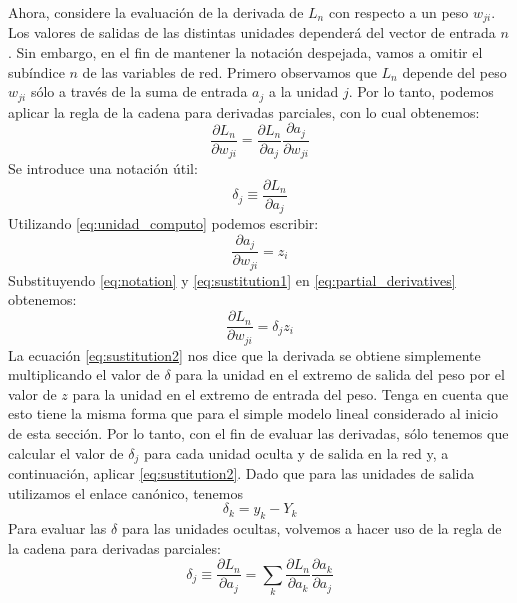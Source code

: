 \documentclass[a4paper,11pt,spanish]{book}
\begin{document}
	Ahora, considere la evaluación de la derivada de $L_n$ con respecto a un peso $w_{ji}$. 
	Los valores de salidas de las distintas unidades dependerá del vector de entrada $n$.
	Sin embargo, en el fin de mantener la notación despejada, vamos a omitir el subíndice $n$ de las variables de red. 
	Primero observamos que $L_n$ depende del peso $w_{ji}$ sólo a través de la suma de entrada $a_j$ a la unidad $j$. 
	Por lo tanto, podemos aplicar la regla de la cadena para derivadas parciales, con lo cual obtenemos:
	\begin{equation} \label{eq:partial_derivatives}
	  \frac{\partial L_n}{\partial w_{ji}} = \frac{\partial L_n}{\partial a_j} \frac{\partial a_j}{\partial w_{ji}}
	\end{equation}
	Se introduce una notación útil:
	\begin{equation} \label{eq:notation}
	  \delta_j \equiv \frac{\partial L_n}{\partial a_j}
	\end{equation}
	Utilizando \eqref{eq:unidad_computo} podemos escribir:
	\begin{equation} \label{eq:sustitution1}
	  \frac{\partial a_j}{\partial w_{ji}} = z_i
	\end{equation}
	Substituyendo \eqref{eq:notation} y \eqref{eq:sustitution1} en \eqref{eq:partial_derivatives} obtenemos:
	\begin{equation} \label{eq:sustitution2}
	  \frac{\partial L_n}{\partial w_{ji}} = \delta_j z_i
	\end{equation}
	La ecuación \eqref{eq:sustitution2} nos dice que la derivada se obtiene simplemente multiplicando el valor de $\delta$ para la unidad en el extremo de salida del peso
	por el valor de $z$ para la unidad en el extremo de entrada del peso. 
	Tenga en cuenta que esto tiene la misma forma que para el simple modelo lineal considerado al inicio de esta sección.
	Por lo tanto, con el fin de evaluar las derivadas, sólo tenemos que calcular el valor de $\delta_j$ para cada unidad oculta y de salida en la red y, 
	a continuación, aplicar \eqref{eq:sustitution2}.
	Dado que para las unidades de salida utilizamos el enlace canónico, tenemos
	\begin{equation} \label{eq:delta_salida}
	  \delta_k = y_k - Y_k
	\end{equation}
	Para evaluar las $\delta$ para las unidades ocultas, volvemos a hacer uso de la regla de la cadena para derivadas parciales:
	\begin{equation}\label{eq:chain_rule}
	  \delta_j \equiv \frac{\partial L_n}{\partial a_j} = \sum_k \frac{\partial L_n}{\partial a_k} \frac{\partial a_k}{\partial a_j}
	\end{equation}
	
\end{document}
